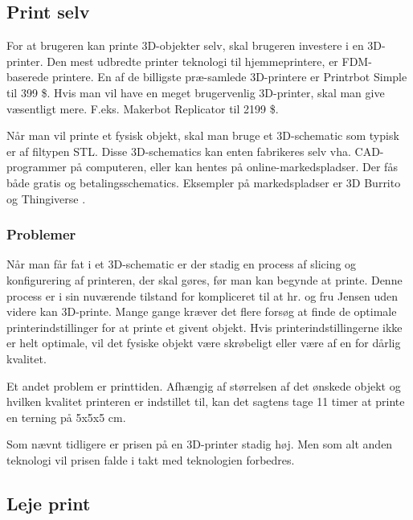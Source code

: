 \subsection{Print selv} %
\label{sub:print_selv}


For at brugeren kan printe 3D-objekter selv, skal brugeren investere i en 3D-printer. Den mest udbredte printer teknologi til hjemmeprintere, er FDM-baserede printere. En af de billigste præ-samlede 3D-printere er Printrbot Simple til 399 \$. \autocite{_assembled_????} Hvis man vil have en meget brugervenlig 3D-printer, skal man give væsentligt mere. F.eks. Makerbot Replicator til 2199 \$. \autocite{_makerbot_????}

Når man vil printe et fysisk objekt, skal man bruge et 3D-schematic som typisk er af filtypen STL. Disse 3D-schematics kan enten fabrikeres selv vha. CAD-programmer på computeren, eller kan hentes på online-markedspladser. Der fås både gratis og betalingsschematics. Eksempler på markedspladser er 3D Burrito \autocite{_3d_2013-1} og Thingiverse \autocite{_thingiverse_????}.


\subsubsection{Problemer} %
\label{ssub:problemer}


Når man får fat i et 3D-schematic er der stadig en process af slicing og konfigurering af printeren, der skal gøres, før man kan begynde at printe. Denne process er i sin nuværende tilstand for kompliceret til at hr. og fru Jensen uden videre kan 3D-printe. Mange gange kræver det flere forsøg at finde de optimale printerindstillinger for at printe et givent objekt. Hvis printerindstillingerne ikke er helt optimale, vil det fysiske objekt være skrøbeligt eller være af en for dårlig kvalitet. \autocite{_3d_2013}

Et andet problem er printtiden. Afhængig af størrelsen af det ønskede objekt og hvilken kvalitet printeren er indstillet til, kan det sagtens tage 11 timer at printe en terning på 5x5x5 cm. \autocite{_3d_2013}

Som nævnt tidligere er prisen på en 3D-printer stadig høj. Men som alt anden teknologi vil prisen falde i takt med teknologien forbedres.





\subsection{Leje print} %
\label{sub:leje_print}



